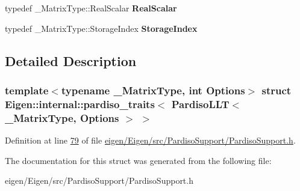 \begin{DoxyCompactItemize}
\mbox{\label{struct_eigen_1_1internal_1_1pardiso__traits_3_01_pardiso_l_l_t_3_01___matrix_type_00_01_options_01_4_01_4_aa2c4b297281ee5d39891f2018d83a5b1}} 
typedef \+\_\+\+Matrix\+Type\+::\+Real\+Scalar {\bfseries Real\+Scalar}
\item 
\mbox{\label{struct_eigen_1_1internal_1_1pardiso__traits_3_01_pardiso_l_l_t_3_01___matrix_type_00_01_options_01_4_01_4_a5cd30f1d5de97b543f995d1ee6aafe30}} 
typedef \+\_\+\+Matrix\+Type\+::\+Storage\+Index {\bfseries Storage\+Index}
\end{DoxyCompactItemize}


\subsection{Detailed Description}
\subsubsection*{template$<$typename \+\_\+\+Matrix\+Type, int Options$>$\newline
struct Eigen\+::internal\+::pardiso\+\_\+traits$<$ Pardiso\+L\+L\+T$<$ \+\_\+\+Matrix\+Type, Options $>$ $>$}



Definition at line \hyperlink{eigen_2_eigen_2src_2_pardiso_support_2_pardiso_support_8h_source_l00079}{79} of file \hyperlink{eigen_2_eigen_2src_2_pardiso_support_2_pardiso_support_8h_source}{eigen/\+Eigen/src/\+Pardiso\+Support/\+Pardiso\+Support.\+h}.



The documentation for this struct was generated from the following file\+:\begin{DoxyCompactItemize}
\item 
eigen/\+Eigen/src/\+Pardiso\+Support/\+Pardiso\+Support.\+h\end{DoxyCompactItemize}
